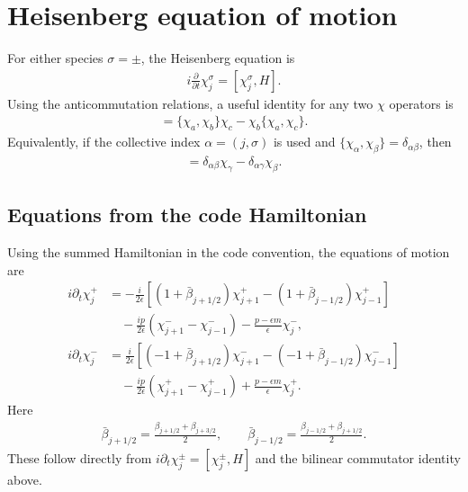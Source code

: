 \documentclass[11pt,a4paper]{article}
\newcommand{\eps}{\epsilon}
\newcommand{\bbeta}{\beta}
\begin{document}
\section{Heisenberg equation of motion}

For either species $\sigma=\pm$, the Heisenberg equation is
\begin{align}
  i\frac{\partial}{\partial t}\chi_j^\sigma
  =
  [\chi_j^\sigma,H].
\end{align}
Using the anticommutation relations, a useful identity for any two
$\chi$ operators is
\begin{align}
  [\chi_a,\chi_b\chi_c]
  =
  \{\chi_a,\chi_b\}\chi_c
  -
  \chi_b\{\chi_a,\chi_c\}.
\end{align}
Equivalently, if the collective index $\alpha=(j,\sigma)$ is used and
$\{\chi_\alpha,\chi_\beta\}=\delta_{\alpha\beta}$, then
\begin{align}
  [\chi_\alpha,\chi_\beta\chi_\gamma]
  =
  \delta_{\alpha\beta}\chi_\gamma
  -
  \delta_{\alpha\gamma}\chi_\beta .
\end{align}

\subsection{Equations from the code Hamiltonian}

Using the summed Hamiltonian in the code convention, the equations of motion
are
\begin{align}
  i\partial_t \chi_j^+
  &=
  -\frac{i}{2\eps}
  \left[
    \left(1+\bar{\bbeta}_{j+1/2}\right)\chi_{j+1}^+
    -
    \left(1+\bar{\bbeta}_{j-1/2}\right)\chi_{j-1}^+
  \right]
  \nonumber\\
  &\quad
  -\frac{i p}{2\eps}
  \left(
    \chi_{j+1}^-
    -
    \chi_{j-1}^-
  \right)
  -
  \frac{p-\eps m}{\eps}\chi_j^- ,
  \\
  i\partial_t \chi_j^-
  &=
  \frac{i}{2\eps}
  \left[
    \left(-1+\bar{\bbeta}_{j+1/2}\right)\chi_{j+1}^-
    -
    \left(-1+\bar{\bbeta}_{j-1/2}\right)\chi_{j-1}^-
  \right]
  \nonumber\\
  &\quad
  -\frac{i p}{2\eps}
  \left(
    \chi_{j+1}^+
    -
    \chi_{j-1}^+
  \right)
  +
  \frac{p-\eps m}{\eps}\chi_j^+ .
\end{align}
Here
\begin{align}
  \bar{\bbeta}_{j+1/2}
  =
  \frac{\bbeta_{j+1/2}+\bbeta_{j+3/2}}{2},
  \qquad
  \bar{\bbeta}_{j-1/2}
  =
  \frac{\bbeta_{j-1/2}+\bbeta_{j+1/2}}{2}.
\end{align}
These follow directly from
$i\partial_t\chi_j^\pm=[\chi_j^\pm,H]$ and the bilinear commutator identity
above.
\end{document}
